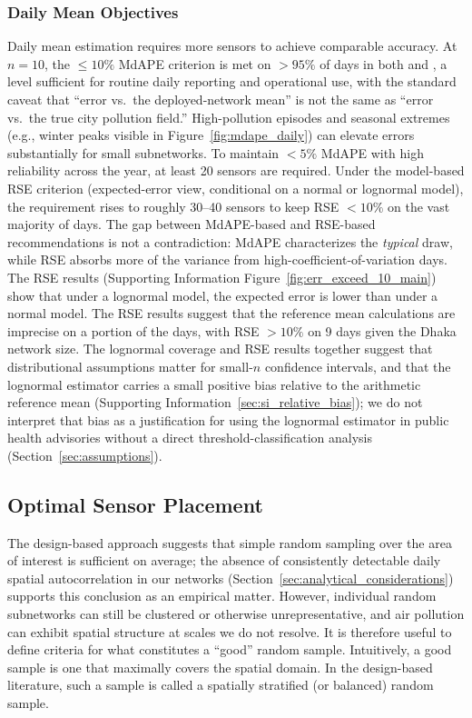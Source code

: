 \documentclass[12pt]{article}
\theoremstyle{remark}
\newcommand{\city}[1]{\capitalisewords{\MakeLowercase{#1}}}
\begin{document}
\subsubsection{Daily Mean Objectives}

Daily mean estimation requires more sensors to achieve comparable accuracy. At $n=10$, the $\le 10\%$ MdAPE criterion is met on $>95\%$ of days in both \city{Dhaka} and \city{Lucknow}, a level sufficient for routine daily reporting and operational use, with the standard caveat that ``error vs.\ the deployed-network mean'' is not the same as ``error vs.\ the true city pollution field.'' High-pollution episodes and seasonal extremes (e.g., winter peaks visible in Figure~\ref{fig:mdape_daily}) can elevate errors substantially for small subnetworks. To maintain $<5\%$ MdAPE with high reliability across the year, at least 20 sensors are required. Under the model-based RSE criterion (expected-error view, conditional on a normal or lognormal model), the requirement rises to roughly 30--40 sensors to keep RSE $<10\%$ on the vast majority of days. The gap between MdAPE-based and RSE-based recommendations is not a contradiction: MdAPE characterizes the \emph{typical} draw, while RSE absorbs more of the variance from high-coefficient-of-variation days. The \city{Lucknow} RSE results (Supporting Information Figure~\ref{fig:err_exceed_10_main}) show that under a lognormal model, the expected error is lower than under a normal model. The \city{Dhaka} RSE results suggest that the reference mean calculations are imprecise on a portion of the days, with RSE $>10\%$ on 9 days given the Dhaka network size. The lognormal coverage and RSE results together suggest that distributional assumptions matter for small-$n$ confidence intervals, and that the lognormal estimator carries a small positive bias relative to the arithmetic reference mean (Supporting Information~\ref{sec:si_relative_bias}); we do not interpret that bias as a justification for using the lognormal estimator in public health advisories without a direct threshold-classification analysis (Section~\ref{sec:assumptions}).

\subsection{Optimal Sensor Placement}\label{sec:placement}
The design-based approach suggests that simple random sampling over the area of interest is sufficient on average; the absence of consistently detectable daily spatial autocorrelation in our networks (Section~\ref{sec:analytical_considerations}) supports this conclusion as an empirical matter. However, individual random subnetworks can still be clustered or otherwise unrepresentative, and air pollution can exhibit spatial structure at scales we do not resolve. It is therefore useful to define criteria for what constitutes a ``good'' random sample. Intuitively, a good sample is one that maximally covers the spatial domain. In the design-based literature, such a sample is called a spatially stratified (or balanced) random sample.\supercite{wang_2012_ReviewSpatialSampling,stevens_2004_SpatiallyBalancedSampling}
\end{document}
